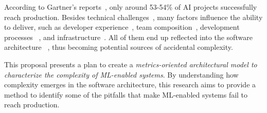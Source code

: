   According to Gartner's reports~\parencite{Gartner2020,Gartner2022},
  only around 53-54\% of AI projects successfully reach production.
  Besides technical challenges~\parencite{Sculley2015HiddenSystems, 
  Thung2012AnSystems}, many factors influence the ability to deliver, such as
    developer experience~\parencite{MartinCleanCode2008,Reilly2022TheChange},
    team composition~\parencite{Nahar2021MoreProjects,Skelton2019TeamFlow},
    development processes ~\parencite{Nahar2021MoreProjects,
    Shankar2022OperationalizingStudy, Wazir2023MLOps:Review}, and
    infrastructure~\parencite{Davis2019CloudPatterns}.
  All of them end up reflected into the software architecture%
  ~\parencite{Brooks1975TheMan-Month, Ford2021SoftwareParts,
  Richards2020FundamentalsApproach}, thus becoming potential
  sources of accidental complexity.

  This proposal presents a plan to create a \emph{metrics-oriented
  architectural model to characterize the complexity of ML-enabled
  systems}. By understanding how complexity emerges in the software
  architecture, this research aims to provide a method to
  identify some of the pitfalls that make ML-enabled systems
  fail to reach production.





